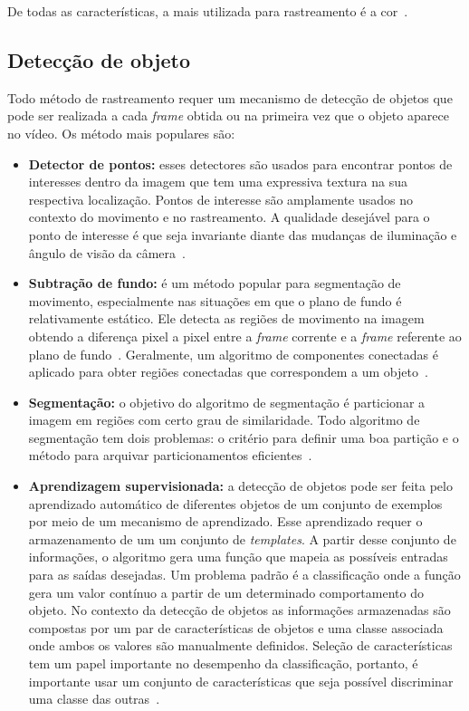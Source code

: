 De todas as características, a mais utilizada para rastreamento é a cor~\cite{yilmaz}.

\subsection{Detecção de objeto}

	Todo método de rastreamento requer um mecanismo de detecção de objetos que pode ser realizada a cada \textit{frame} obtida ou na primeira vez que o objeto aparece no vídeo. Os método mais populares são:


	\begin{itemize}
		\item \textbf{Detector de pontos:} esses detectores são usados para encontrar pontos de interesses dentro da imagem que tem uma expressiva textura na sua respectiva localização. Pontos de interesse são amplamente usados no contexto do movimento e no rastreamento. A qualidade desejável para o ponto de interesse é que seja invariante diante das mudanças de iluminação e ângulo de visão da câmera~\cite{yilmaz}.
	
		\item \textbf{Subtração de fundo:} é um método popular para segmentação de movimento, especialmente nas situações em que o plano de fundo é relativamente estático. Ele detecta as regiões de movimento na imagem obtendo a diferença pixel a pixel entre a \textit{frame} corrente e a \textit{frame} referente ao plano de fundo~\cite{weiming}. Geralmente, um algoritmo de componentes conectadas é aplicado para obter regiões conectadas que correspondem a um objeto~\cite{yilmaz}.

		\item \textbf{Segmentação:} o objetivo do algoritmo de segmentação é particionar a imagem em regiões com certo grau de similaridade. Todo algoritmo de segmentação tem dois problemas: o critério para definir uma boa partição e o método para arquivar particionamentos eficientes~\cite{yilmaz}.

		\item \textbf{Aprendizagem supervisionada:} a detecção de objetos pode ser feita pelo aprendizado automático de diferentes objetos de um conjunto de exemplos por meio de um mecanismo de aprendizado. Esse aprendizado requer o armazenamento de um um conjunto de \textit{templates}. A partir desse conjunto de informações, o algoritmo gera uma função que mapeia as possíveis entradas para as saídas desejadas. Um problema padrão é a classificação onde a função gera um valor contínuo a partir de um determinado comportamento do objeto. No contexto da detecção de objetos as informações armazenadas são compostas por um par de características de objetos e uma classe associada onde ambos os valores são manualmente definidos. Seleção de características tem um papel importante no desempenho da classificação, portanto, é importante usar um conjunto de características que seja possível discriminar uma classe das outras~\cite{yilmaz}.
	\end{itemize}


